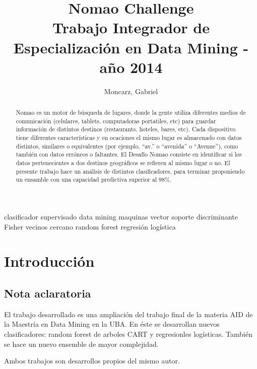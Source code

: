 \documentclass[journal]{IEEEtran}
\begin{document}
\title{  Nomao Challenge \\
	{\large Trabajo Integrador de Especialización en Data Mining - año 2014} \\
} 
\author{Moncarz, Gabriel} 
\maketitle %


\begin{abstract}
Nomao es un motor de búsqueda de lugares, donde la gente utiliza diferentes medios
de comunicación (celulares, tablets, computadoras portatiles, etc) 
para guardar información de distintos destinos (restaurants, hoteles,
bares, etc). Cada dispositivo tiene diferentes características y 
en ocaciones el mismo lugar
es almacenado con datos distintos, similares o equivalentes (por ejemplo, ``av.'' o
``avenida'' o ``Avenue''), como también con datos erróneos o faltantes. 
El Desafío Nomao consiste en identificar si los datos pertenecientes
a dos destinos geográficos se refieren al mismo lugar o no. El presente
trabajo hace un análisis de distintos clasificadores, para terminar
proponiendo un ensamble con una capacidad predictiva superior al 98\%.
\end{abstract}

\begin{IEEEkeywords}
clasificador supervisado data mining maquinas vector soporte
discriminante Fisher vecinos cercano random forest
regresión logística
\end{IEEEkeywords}

\tableofcontents

\section{Introducción}

\subsection{Nota aclaratoria}
El trabajo desarrollado es una ampliación del trabajo final de la materia
AID de la Maestría en Data Mining en la UBA. En éste se desarrollan nuevos
clasificadores: random forest de arboles CART y regresionles logísticas.
También se hace un nuevo ensemble de mayor complejidad.

Ambos trabajos son desarrollos propios del mismo autor.
\end{document}

